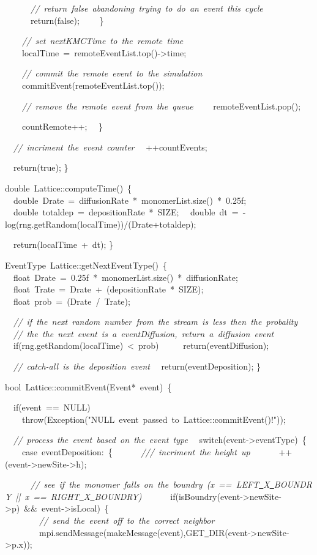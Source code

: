 {\ \ \ \ \ \ \textsl{//\ return\ false\ abandoning\ trying\ to\ do\ an\ event\ this\ cycle}
\ \ \ \ \ \ return(false);
\ \ \ \ \}

\ \ \ \ \textsl{//\ set\ nextKMCTime\ to\ the\ remote\ time}
\ \ \ \ localTime\ =\ remoteEventList.top()-{}>{}time;

\ \ \ \ \textsl{//\ commit\ the\ remote\ event\ to\ the\ simulation}
\ \ \ \ commitEvent(remoteEventList.top());

\ \ \ \ \textsl{//\ remove\ the\ remote\ event\ from\ the\ queue}
\ \ \ \ remoteEventList.pop();

\ \ \ \ countRemote++;
\ \ \}

\ \ \textsl{//\ incriment\ the\ event\ counter}
\ \ ++countEvents;

\ \ return(true);
\}

double\ Lattice::computeTime()\ \{
\ \ double\ Drate\ =\ diffusionRate\ *\ monomerList.size()\ *\ 0.25f;
\ \ double\ totaldep\ =\ depositionRate\ *\ SIZE;
\ \ double\ dt\ =\ -{}log(rng.getRandom(localTime))/(Drate+totaldep);

\ \ return(localTime\ +\ dt);
\}

EventType\ Lattice::getNextEventType()\ \{
\ \ float\ Drate\ =\ 0.25f\ *\ monomerList.size()\ *\ diffusionRate;
\ \ float\ Trate\ =\ Drate\ +\ (depositionRate\ *\ SIZE);
\ \ float\ prob\ =\ (Drate\ /\ Trate);

\ \ \textsl{//\ if\ the\ next\ random\ number\ from\ the\ stream\ is\ less\ then\ the\ probality}
\ \ \textsl{//\ the\ the\ next\ event\ is\ a\ eventDiffusion,\ return\ a\ diffusion\ event}
\ \ if(rng.getRandom(localTime)\ <{}\ prob)
\ \ \ \ \ return(eventDiffusion);

\ \ \textsl{//\ catch-{}all\ is\ the\ deposition\ event}
\ \ return(eventDeposition);
\}

bool\ Lattice::commitEvent(Event*\ event)\ \{

\ \ if(event\ ==\ NULL)
\ \ \ \ throw(Exception("{}NULL\ event\ passed\ to\ Lattice::commitEvent()!"{}));

\ \ \textsl{//\ process\ the\ event\ based\ on\ the\ event\ type}
\ \ switch(event-{}>{}eventType)\ \{
\ \ \ \ case\ eventDeposition:\ \{
\ \ \ \ \ \ \textsl{///\ incriment\ the\ height\ up}
\ \ \ \ \ \ ++(event-{}>{}newSite-{}>{}h);

\ \ \ \ \ \ \textsl{//\ see\ if\ the\ monomer\ falls\ on\ the\ boundry\ (x\ ==\ LEFT\underline\ X\underline\ BOUNDRY\ ||\ x\ ==\ RIGHT\underline\ X\underline\ BOUNDRY)}
\ \ \ \ \ \ if(isBoundry(event-{}>{}newSite-{}>{}p)\ \&\&\ event-{}>{}isLocal)\ \{
\ \ \ \ \ \ \ \ \textsl{//\ send\ the\ event\ off\ to\ the\ correct\ neighbor}
\ \ \ \ \ \ \ \ mpi.sendMessage(makeMessage(event),GET\underline\ DIR(event-{}>{}newSite-{}>{}p.x));

}
